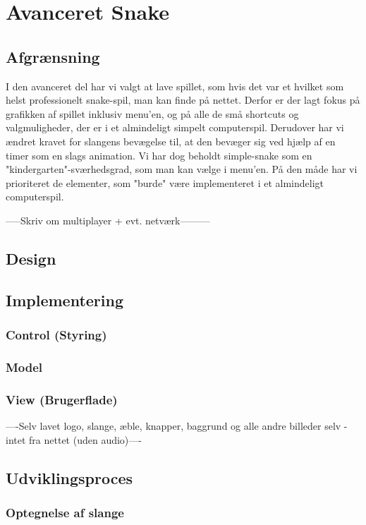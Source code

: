 \documentclass{report}
\begin{document}
\chapter{Avanceret Snake}
\section{Afgrænsning}
I den avanceret del har vi valgt at lave spillet, som hvis det var et hvilket som helst professionelt snake-spil, man kan finde på nettet. Derfor er der lagt fokus på grafikken af spillet inklusiv menu'en, og på alle de små shortcuts og valgmuligheder, der er i et almindeligt simpelt computerspil. Derudover har vi ændret kravet for slangens bevægelse til, at den bevæger sig ved hjælp af en timer som en slags animation. Vi har dog beholdt simple-snake som en "kindergarten"-sværhedsgrad, som man kan vælge i menu'en.
På den måde har vi prioriteret de elementer, som "burde" være implementeret i et almindeligt computerspil. 

-----Skriv om multiplayer + evt. netværk---------
\section{Design}

\section{Implementering}

\subsection{Control (Styring)}

\subsection{Model}

\subsection{View (Brugerflade)}
----Selv lavet logo, slange, æble, knapper, baggrund og alle andre billeder selv - intet fra nettet (uden audio)----


\section{Udviklingsproces}

\subsection{Optegnelse af slange}
\end{document}

